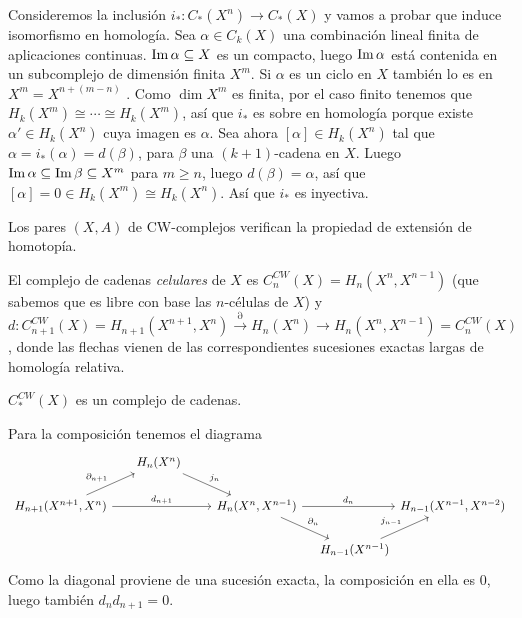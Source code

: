 \documentclass[TA.tex]{subfiles}
\begin{document}
\begin{lemma}
\begin{dem}
\begin{enumerate}
 Consideremos la inclusión $i_*:C_*(X^n)\to C_*(X)$ y vamos a probar que induce isomorfismo en homología. Sea $\alpha\in C_k(X)$ una combinación lineal finita de aplicaciones continuas. $\operatorname{Im}\alpha\subseteq X$ es un compacto, luego $\operatorname{Im}\alpha$ está contenida en un subcomplejo de dimensión finita $X^m$. Si $\alpha$ es un ciclo en $X$ también lo es en $X^m=X^{n+(m-n)}$ . Como $\dim X^m$ es finita, por el caso finito tenemos que $H_k(X^m)\cong\cdots\cong H_k(X^m)$, así que $i_*$ es sobre en homología porque existe $\alpha'\in H_k(X^n)$ cuya imagen es $\alpha$. Sea ahora $[\alpha]\in H_k(X^n)$ tal que $\alpha=i_*(\alpha)=d(\beta)$, para $\beta$ una $(k+1)$-cadena en $X$. Luego $\operatorname{Im}\alpha\subseteq\operatorname{Im}\beta\subseteq X^m$ para $m\geq n$, luego $d(\beta)=\alpha$, así que $[\alpha]=0\in H_k(X^m)\cong H_k(X^n)$. Así que $i_*$ es inyectiva. 
\end{enumerate}
\end{dem}
\end{lemma}

\begin{prop}
Los pares $(X,A)$ de CW-complejos verifican la propiedad de extensión de homotopía. 
\end{prop}


\begin{defi}
El complejo de cadenas \emph{celulares} de $X$ es $C_n^{CW}(X)=H_n(X^n,X^{n-1})$ (que sabemos que es libre con base las $n$-células de $X$) y $d:C_{n+1}^{CW}(X)=H_{n+1}(X^{n+1},X^n)\xrightarrow{\partial}H_n(X^n)\to H_n(X^n, X^{n-1})=C_n^{CW}(X)$, donde las flechas vienen de las correspondientes sucesiones exactas largas de homología relativa.
\end{defi}

\begin{prop}
$C_*^{CW}(X)$ es un complejo de cadenas.
\end{prop}
\begin{dem}
Para la composición tenemos el diagrama
\[
\begin{tikzcd}[column sep={80,between origins}]
&                                             H_n(X^n)\arrow[dr, "j_n"] &           						& &\\
H_{n+1}(X^{n+1},X^n)\arrow[rr, "d_{n+1}"]\arrow[ur, "\partial_{n+1}"] & & H_n(X^n,X^{n-1})\arrow[rr, "d_n"]\arrow[dr,"\partial_n"] & & H_{n-1}(X^{n-1}, X^{n-2})\\
&                                                                       &                                   & H_{n-1}(X^{n-1})\arrow[ur, "j_{n-1}"]&
\end{tikzcd}
\]
Como la diagonal proviene de una sucesión exacta, la composición en ella es 0, luego también $d_nd_{n+1}=0$. 
\end{dem}
\end{document}
